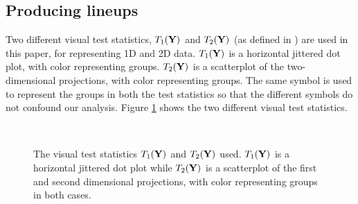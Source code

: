 \subsection{Producing lineups}

Two different visual test statistics, $T_1(\bf{Y})$ and $T_2(\bf{Y})$ (as defined in \cite{majumder:2011}) are used in this paper, for representing 1D and 2D data. $T_1(\bf{Y})$ is a horizontal jittered dot plot, with color representing groups. $T_2(\bf{Y})$ is a scatterplot of the two-dimensional projections, with color representing groups. The same symbol is used to represent the groups in both the test statistics so that the different symbols do not confound our analysis. Figure \ref{fig3} shows the two different visual test statistics.

\begin{figure}[htbp]
\centering
\mbox{\quad
{}}
\caption{The visual test statistics $T_1(\bf{Y})$ and $T_2(\bf{Y})$ used.  $T_1(\bf{Y})$ is a horizontal jittered dot plot while $T_2(\bf{Y})$ is a scatterplot of the first and second dimensional projections, with color representing groups in both cases. } 
\label{fig3}
\end{figure}

%
%
%
%

